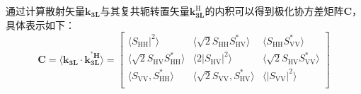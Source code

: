 通过计算散射矢量$\textbf{k}_{\textbf{3L}}$与其复共轭转置矢量$\textbf{k}_{\textbf{3L}}^{\text{H}}$的内积可以得到极化协方差矩阵$\textbf{C}$，具体表示如下：
\begin{equation}
    \textbf{C}=\left. \langle \textbf{k}_{\textbf{3L}}\cdot \textbf{k}_{\textbf{3L}}^{^*\boldsymbol{H}} \right. \rangle =\left[ \begin{matrix}
            \left. \langle \left. S_{\mathrm{HH}} \right|^2 \right. \rangle           & \left. \langle \sqrt{2}S_{\mathrm{HH}}S_{\mathrm{HV}}^{*} \right. \rangle  & \left. \langle S_{\mathrm{HH}}S_{\mathrm{VV}}^{*} \right. \rangle         \\
            \left. \langle \sqrt{2}S_{\mathrm{HV}}S_{\mathrm{HH}}^{*} \right. \rangle & \left. \langle 2\left| S_{\mathrm{HV}} \right|^2 \right. \rangle           & \left. \langle \sqrt{2}S_{\mathrm{HV}}S_{\mathrm{VV}}^{*} \right. \rangle \\
            \left. \langle S_{\mathrm{VV}},S_{\mathrm{HH}}^{*} \right. \rangle        & \left. \langle \sqrt{2}S_{\mathrm{VV}},S_{\mathrm{HV}}^{*} \right. \rangle & \left. \langle \left| S_{\mathrm{VV}} \right|^2 \right. \rangle           \\
        \end{matrix} \right]
\end{equation}

